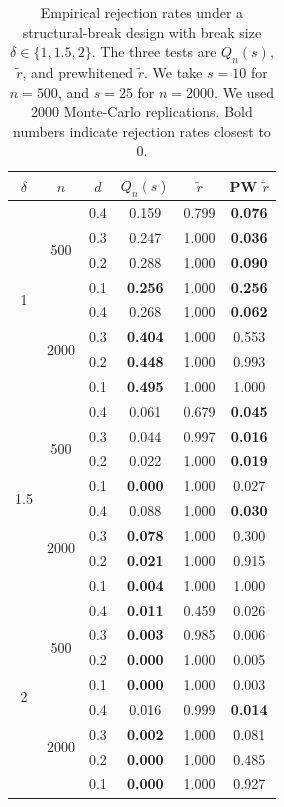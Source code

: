 \documentclass[12pt]{article}
\numberwithin{equation}{section}
\begin{document}
\begin{table}[H]
\centering
\caption{Empirical rejection rates under a structural-break design with break size $\delta \in \{1,1.5,2\}$. The three tests are $Q_n(s)$, $\tilde r$, and prewhitened $\tilde r$.  We take $s=10$ for $n=500$,   and $s=25$ for $n=2000$. We used 2000 Monte-Carlo replications. Bold numbers indicate rejection rates closest to $0$.}
\label{tab:three_tests_break}
\begin{tabular}{cccccc}
\hline
$\delta$ & $n$ & $d$ & $Q_n(s)$ & $\tilde r$ & PW $\tilde r$\\
\hline
\multirow{8}{*}{1} & \multirow{4}{*}{500} & 0.4 & 0.159 & 0.799 & \textbf{0.076} \\
 &  & 0.3 & 0.247 & 1.000 & \textbf{0.036} \\
 &  & 0.2 & 0.288 & 1.000 & \textbf{0.090} \\
 &  & 0.1 & \textbf{0.256} & 1.000 & \textbf{0.256} \\
\cline{2-6}
 & \multirow{4}{*}{2000} & 0.4 & 0.268 & 1.000 & \textbf{0.062} \\
 &  & 0.3 & \textbf{0.404} & 1.000 & 0.553 \\
 &  & 0.2 & \textbf{0.448} & 1.000 & 0.993 \\
 &  & 0.1 & \textbf{0.495} & 1.000 & 1.000 \\
\hline
\multirow{8}{*}{1.5} & \multirow{4}{*}{500} & 0.4 & 0.061 & 0.679 & \textbf{0.045} \\
 &  & 0.3 & 0.044 & 0.997 & \textbf{0.016} \\
 &  & 0.2 & 0.022 & 1.000 & \textbf{0.019} \\
 &  & 0.1 & \textbf{0.000} & 1.000 & 0.027 \\
\cline{2-6}
 & \multirow{4}{*}{2000} & 0.4 & 0.088 & 1.000 & \textbf{0.030} \\
 &  & 0.3 & \textbf{0.078} & 1.000 & 0.300 \\
 &  & 0.2 & \textbf{0.021} & 1.000 & 0.915 \\
 &  & 0.1 & \textbf{0.004} & 1.000 & 1.000 \\
\hline
\multirow{8}{*}{2} & \multirow{4}{*}{500} & 0.4 & \textbf{0.011} & 0.459 & 0.026 \\
 &  & 0.3 & \textbf{0.003} & 0.985 & 0.006 \\
 &  & 0.2 & \textbf{0.000} & 1.000 & 0.005 \\
 &  & 0.1 & \textbf{0.000} & 1.000 & 0.003 \\
\cline{2-6}
 & \multirow{4}{*}{2000} & 0.4 & 0.016 & 0.999 & \textbf{0.014} \\
 &  & 0.3 & \textbf{0.002} & 1.000 & 0.081 \\
 &  & 0.2 & \textbf{0.000} & 1.000 & 0.485 \\
 &  & 0.1 & \textbf{0.000} & 1.000 & 0.927 \\
\hline
\end{tabular}
\end{table}
\clearpage
\end{document}
